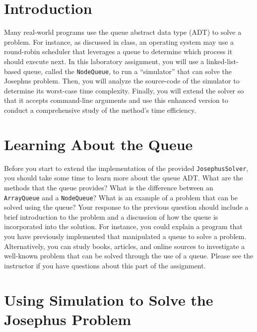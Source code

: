 


\usepackage[compact]{titlesec}


\section*{Introduction}

  Many real-world programs use the queue abstract data type (ADT) to solve a problem.  For instance, as discussed in
  class, an operating system may use a round-robin scheduler that leverages a queue to determine which process it should
  execute next. In this laboratory assignment, you will use a linked-list-based queue, called the {\tt NodeQueue}, to
  run a ``simulator'' that can solve the Josephus problem. Then, you will analyze the source-code of the simulator to
  determine its worst-case time complexity.  Finally, you will extend the solver so that it accepts command-line
  arguments and use this enhanced version to conduct a comprehensive study of the method's time efficiency.

\section*{Learning About the Queue}

  Before you start to extend the implementation of the provided {\tt JosephusSolver}, you should take some time to learn
  more about the queue ADT.  What are the methods that the queue provides?  What is the difference between an {\tt
    ArrayQueue} and a {\tt NodeQueue}? What is an example of a problem that can be solved using the queue? Your response
  to the previous question should include a brief introduction to the problem and a discussion of how the queue is
  incorporated into the solution. For instance, you could explain a program that you have previously implemented that
  manipulated a queue to solve a problem.  Alternatively, you can study books, articles, and online sources to
  investigate a well-known problem that can be solved through the use of a queue.  Please see the instructor if you have
  questions about this part of the assignment.

\section*{Using Simulation to Solve the Josephus Problem}

